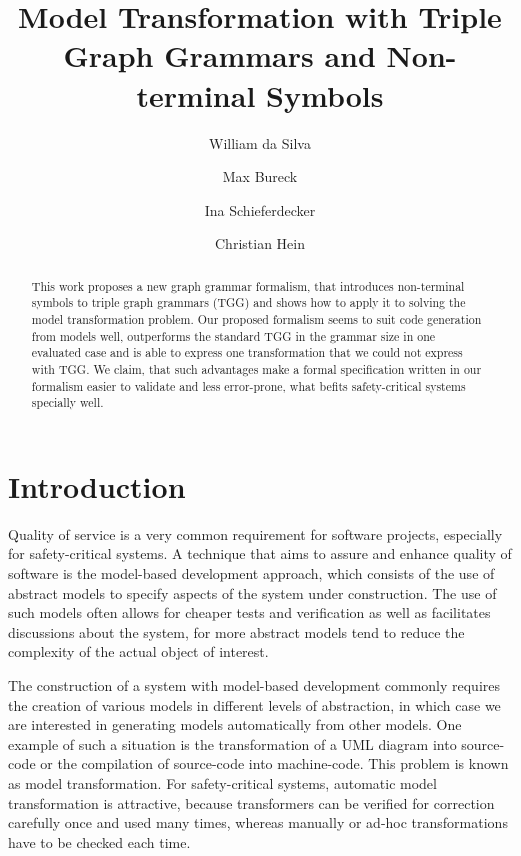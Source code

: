 \documentclass[runningheads]{llncs}
\begin{document}
%
\title{Model Transformation with Triple Graph Grammars and Non-terminal Symbols}
%
%
\author{William {da Silva} \and
Max {Bureck} \and
Ina {Schieferdecker} \and
Christian {Hein}}
%
%
%
\maketitle              %
%
\begin{abstract}
This work proposes a new graph grammar formalism, that introduces non-terminal symbols to triple graph grammars (TGG) and shows how to apply it to solving the model transformation problem. Our proposed formalism seems to suit code generation from models well, outperforms the standard TGG in the grammar size in one evaluated case and is able to express one transformation that we could not express with TGG. We claim, that such advantages make a formal specification written in our formalism easier to validate and less error-prone, what befits safety-critical systems specially well.

\end{abstract}
%
%
%
\section{Introduction}
Quality of service is a very common requirement for software projects, especially for safety-critical systems. A technique that aims to assure and enhance quality of software is the model-based development approach, which consists of the use of abstract models to specify aspects of the system under construction. The use of such models often allows for cheaper tests and verification as well as facilitates discussions about the system, for more abstract models tend to reduce the complexity of the actual object of interest. 

The construction of a system with model-based development commonly requires the creation of various models in different levels of abstraction, in which case we are interested in generating models automatically from other models. One example of such a situation is the transformation of a UML diagram into source-code or the compilation of source-code into machine-code. This problem is known as model transformation. For safety-critical systems, automatic model transformation is attractive, because transformers can be verified for correction carefully once and used many times, whereas manually or ad-hoc transformations have to be checked each time.
\end{document}
